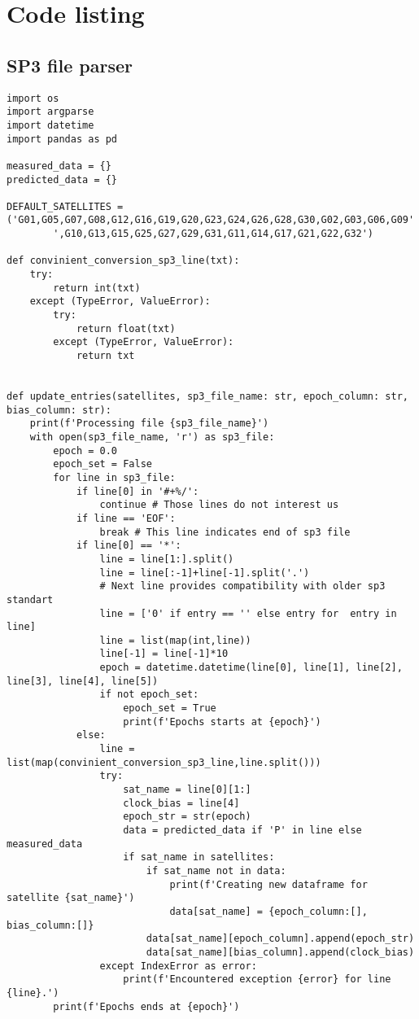 
\chapter{Code listing} %

\section{SP3 file parser}


\begin{lstlisting}[frame=single]
import os
import argparse
import datetime
import pandas as pd

measured_data = {}
predicted_data = {}

DEFAULT_SATELLITES = ('G01,G05,G07,G08,G12,G16,G19,G20,G23,G24,G26,G28,G30,G02,G03,G06,G09'
        ',G10,G13,G15,G25,G27,G29,G31,G11,G14,G17,G21,G22,G32')

def convinient_conversion_sp3_line(txt):
    try:
        return int(txt)
    except (TypeError, ValueError):
        try:
            return float(txt)
        except (TypeError, ValueError):
            return txt


def update_entries(satellites, sp3_file_name: str, epoch_column: str, bias_column: str):
    print(f'Processing file {sp3_file_name}')
    with open(sp3_file_name, 'r') as sp3_file:
        epoch = 0.0
        epoch_set = False
        for line in sp3_file:
            if line[0] in '#+%/':
                continue # Those lines do not interest us
            if line == 'EOF':
                break # This line indicates end of sp3 file
            if line[0] == '*':
                line = line[1:].split()
                line = line[:-1]+line[-1].split('.')
                # Next line provides compatibility with older sp3 standart
                line = ['0' if entry == '' else entry for  entry in line]
                line = list(map(int,line))
                line[-1] = line[-1]*10
                epoch = datetime.datetime(line[0], line[1], line[2], line[3], line[4], line[5])
                if not epoch_set:
                    epoch_set = True
                    print(f'Epochs starts at {epoch}')
            else:
                line = list(map(convinient_conversion_sp3_line,line.split()))
                try:
                    sat_name = line[0][1:]
                    clock_bias = line[4]
                    epoch_str = str(epoch)
                    data = predicted_data if 'P' in line else measured_data
                    if sat_name in satellites:
                        if sat_name not in data:
                            print(f'Creating new dataframe for satellite {sat_name}')
                            data[sat_name] = {epoch_column:[], bias_column:[]}
                        data[sat_name][epoch_column].append(epoch_str)
                        data[sat_name][bias_column].append(clock_bias)
                except IndexError as error:
                    print(f'Encountered exception {error} for line {line}.')
        print(f'Epochs ends at {epoch}')


\end{lstlisting}
